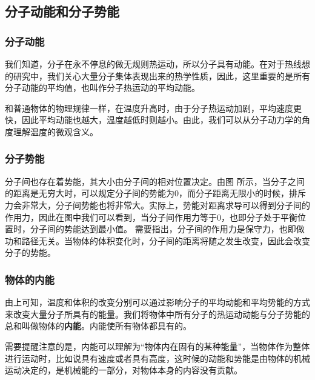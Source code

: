 \subsection{分子动能和分子势能}
\subsubsection{分子动能}
我们知道，分子在永不停息的做无规则热运动，所以分子具有动能。在对于热线想的研究中，我们关心大量分子集体表现出来的热学性质，因此，这里重要的是所有分子动能的平均值，也叫作分子热运动的平均动能。

和普通物体的物理规律一样，在温度升高时，由于分子热运动加剧，平均速度更快，因此平均动能也越大，温度越低时则越小。由此，我们可以从分子动力学的角度理解温度的微观含义。

\subsubsection{分子势能}
分子间也存在着势能，其大小由分子间的相对位置决定。由图%
所示，当分子之间的距离是无穷大时，可以规定分子间的势能为$0$，而分子距离无限小的时候，排斥力会非常大，分子间势能也将非常大。实际上，势能对距离求导可以得到分子间的作用力，因此在图中我们可以看到，当分子间作用力等于$0$，也即分子处于平衡位置时，分子间的势能达到最小值。
需要指出，分子间的作用力是保守力，也即做功和路径无关。当物体的体积变化时，分子间的距离将随之发生改变，因此会改变分子的势能。

\subsubsection{物体的内能}
由上可知，温度和体积的改变分别可以通过影响分子的平均动能和平均势能的方式来改变大量分子所具有的能量。我们将物体中所有分子的热运动动能与分子势能的总和叫做物体的\textbf{内能}。内能使所有物体都具有的。

需要提醒注意的是，内能可以理解为“物体内在固有的某种能量”，当物体作为整体进行运动时，比如说具有速度或者具有高度，这时候的动能和势能是由物体的机械运动决定的，是机械能的一部分，对物体本身的内容没有贡献。